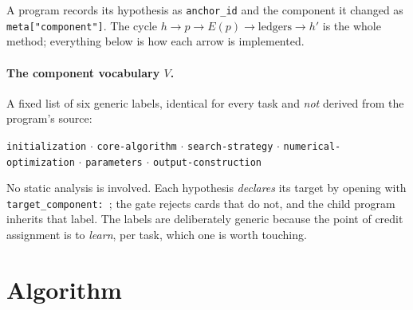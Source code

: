 \documentclass[11pt]{article}
\begin{document}
\noindent A program records its hypothesis as \texttt{anchor\_id} and the component it changed as
\texttt{meta["component"]}. The cycle $h \to p \to E(p) \to \text{ledgers} \to h'$ is the whole
method; everything below is how each arrow is implemented.

\paragraph{The component vocabulary $V$.} A fixed list of six generic labels, identical for every
task and \emph{not} derived from the program's source:
\begin{center}\small
\texttt{initialization} $\cdot$ \texttt{core-algorithm} $\cdot$ \texttt{search-strategy} $\cdot$
\texttt{numerical-optimization} $\cdot$ \texttt{parameters} $\cdot$ \texttt{output-construction}
\end{center}
No static analysis is involved. Each hypothesis \emph{declares} its target by opening with
\texttt{target\_component:\ <one of the six>}; the gate rejects cards that do not, and the child
program inherits that label. The labels are deliberately generic because the point of credit
assignment is to \emph{learn}, per task, which one is worth touching.

\section{Algorithm}
\end{document}

